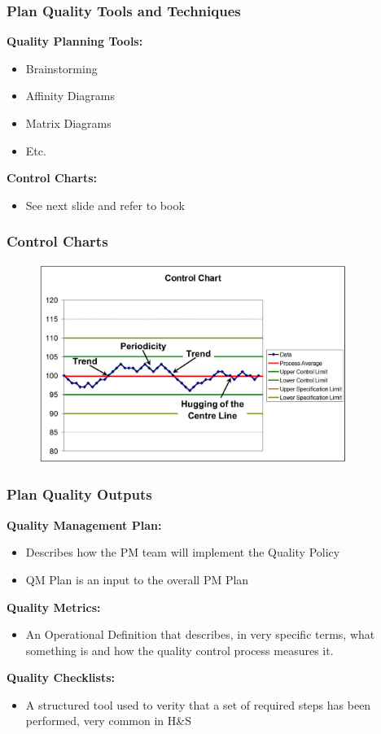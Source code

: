 \begin{frame}
\frametitle{Plan Quality \hfill Tools and Techniques}
\textbf{Quality Planning Tools:}
\begin{itemize}
	\item Brainstorming
	\item Affinity Diagrams
	\item Matrix Diagrams
	\item Etc.
\end{itemize}
\textbf{Control Charts:}
\begin{itemize}
	\item See next slide and refer to book
\end{itemize}	
\end{frame}




\begin{frame}
\frametitle{Control Charts}
\begin{figure}
	\centering
		\includegraphics[width = 10cm]{images/controlchart.jpg}
	\label{fig:contolchart}
\end{figure}
\end{frame}




\begin{frame}
\frametitle{Plan Quality \hfill Outputs}

\textbf{Quality Management Plan:}
\begin{itemize}
	\item Describes how the PM team will implement the Quality Policy
	\item QM Plan is an input to the overall PM Plan
\end{itemize}
\textbf{Quality Metrics:}
\begin{itemize}
	\item An Operational Definition that describes, in very specific terms, what something is and how the quality control process measures it.
\end{itemize}	
\textbf{Quality Checklists:}
\begin{itemize}
	\item A structured tool used to verity that a set of required steps has been performed, very common in H\&S
\end{itemize}
\end{frame}




